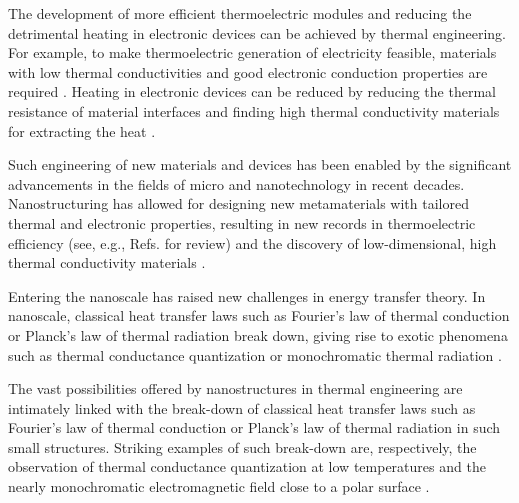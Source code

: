 
The development of more efficient thermoelectric modules and reducing the detrimental heating in electronic devices can be achieved by thermal engineering. For example, to make thermoelectric generation of electricity feasible, materials with low thermal conductivities and good electronic conduction properties are required \cite{chen}. Heating in electronic devices can be reduced by reducing the thermal resistance of material interfaces and finding high thermal conductivity materials for extracting the heat \cite{pop10}. 

Such engineering of new materials and devices has been enabled by the significant advancements in the fields of micro and nanotechnology in recent decades. Nanostructuring has allowed for designing new metamaterials with tailored thermal and electronic properties, resulting in new records in thermoelectric efficiency (see, e.g., Refs. \cite{vineis10,kanatzidis10,shakouri11} for review) and the discovery of low-dimensional, high thermal conductivity materials \cite{}. 

Entering the nanoscale has raised new challenges in energy transfer theory. In nanoscale, classical heat transfer laws such as Fourier's law of thermal conduction \cite{fourier} or Planck's law of thermal radiation \cite{planck00a} break down, giving rise to exotic phenomena such as thermal conductance quantization or monochromatic thermal radiation \cite{carminati99,shchegrov00}. 



The vast possibilities offered by nanostructures in thermal engineering are intimately linked with the break-down of classical heat transfer laws such as Fourier's law of thermal conduction \cite{fourier} or Planck's law of thermal radiation \cite{planck00a} in such small structures. Striking examples of such break-down are, respectively, the observation of thermal conductance quantization at low temperatures \cite{rego98,schwab00} and the nearly monochromatic electromagnetic field close to a polar surface \cite{carminati99,shchegrov00}. 



